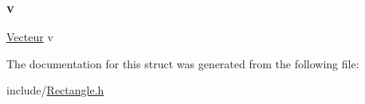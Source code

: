\mbox{\label{struct_rectangle_a5ff420022374621dd6186970680c7276}} 
\subsubsection{\texorpdfstring{v}{v}}
{\footnotesize\ttfamily \hyperlink{struct_vecteur}{Vecteur} v}



The documentation for this struct was generated from the following file\+:\begin{DoxyCompactItemize}
\item 
include/\hyperlink{_rectangle_8h}{Rectangle.\+h}\end{DoxyCompactItemize}
